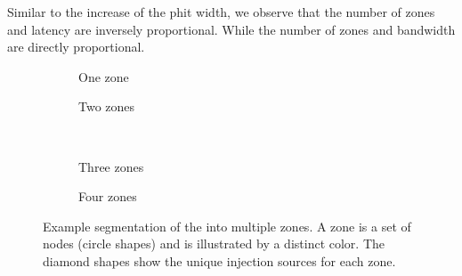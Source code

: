 Similar to the increase of the phit width, we observe that the number of zones and latency are inversely proportional. While the number of zones and bandwidth are directly proportional.

\begin{figure}[htbp]
    \centering
    \begin{subfigure}[b]{0.48\linewidth}
        \centering
        \begin{adjustbox}{width=0.6\linewidth}
            
        \end{adjustbox}
        \caption{One zone}
        \label{fig:segmentation_example_1}
    \end{subfigure}
    \hfill
    \begin{subfigure}[b]{0.48\linewidth}
        \centering
        \begin{adjustbox}{width=0.6\linewidth}
            
        \end{adjustbox}
        \caption{Two zones}
        \label{fig:segmentation_example_2}
    \end{subfigure}
    \\ \vspace{1.5em}
    \begin{subfigure}[b]{0.48\linewidth}
        \centering
        \begin{adjustbox}{width=0.6\linewidth}
            
        \end{adjustbox}
        \caption{Three zones}
        \label{fig:segmentation_example_3}
    \end{subfigure}
    \hfill
    \begin{subfigure}[b]{0.48\linewidth}
        \centering
        \begin{adjustbox}{width=0.6\linewidth}
            
        \end{adjustbox}
        \caption{Four zones}
        \label{fig:segmentation_example_4}
    \end{subfigure}
    \caption{
    Example segmentation of the \confignoc{} into multiple zones.
    A zone is a set of nodes (circle shapes) and is illustrated by a distinct color.
    The diamond shapes show the unique injection sources for each zone.
    }
    \label{fig:segmentation_example}
\end{figure}

